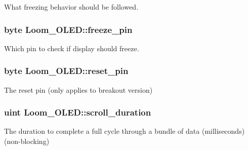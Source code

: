 What \textquotesingle{}freezing\textquotesingle{} behavior should be followed. 

\subsubsection[{\texorpdfstring{freeze\+\_\+pin}{freeze_pin}}]{\setlength{\rightskip}{0pt plus 5cm}byte Loom\+\_\+\+O\+L\+E\+D\+::freeze\+\_\+pin\hspace{0.3cm}{\ttfamily [protected]}}\hypertarget{class_loom___o_l_e_d_a693dc20156729cb7d06e877247e914d0}{}\label{class_loom___o_l_e_d_a693dc20156729cb7d06e877247e914d0}


Which pin to check if display should freeze. 

\subsubsection[{\texorpdfstring{reset\+\_\+pin}{reset_pin}}]{\setlength{\rightskip}{0pt plus 5cm}byte Loom\+\_\+\+O\+L\+E\+D\+::reset\+\_\+pin\hspace{0.3cm}{\ttfamily [protected]}}\hypertarget{class_loom___o_l_e_d_a8962f61e0211d70d1d1de489d1d6bbfa}{}\label{class_loom___o_l_e_d_a8962f61e0211d70d1d1de489d1d6bbfa}


The reset pin (only applies to breakout version) 

\subsubsection[{\texorpdfstring{scroll\+\_\+duration}{scroll_duration}}]{\setlength{\rightskip}{0pt plus 5cm}uint Loom\+\_\+\+O\+L\+E\+D\+::scroll\+\_\+duration\hspace{0.3cm}{\ttfamily [protected]}}\hypertarget{class_loom___o_l_e_d_ad6893fc088b080440f2f1d5d6f84d461}{}\label{class_loom___o_l_e_d_ad6893fc088b080440f2f1d5d6f84d461}


The duration to complete a full cycle through a bundle of data (milliseconds)(non-\/blocking) 

